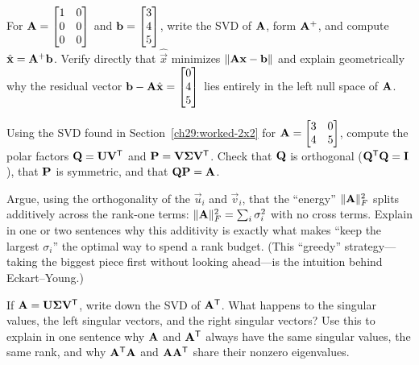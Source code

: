 \begin{exercise}
\label{ch29:ex-pinv}
For $\mathbf{A} = \begin{bmatrix} 1 & 0 \\ 0 & 0 \\ 0 & 0\end{bmatrix}$ and
$\mathbf{b} = \begin{bmatrix}3\\4\\5\end{bmatrix}$, write the SVD of $\mathbf{A}$, form $\mathbf{A}^+$, and
compute $\hat{\mathbf{x}} = \mathbf{A}^+\mathbf{b}$. Verify directly that
$\hat{\vec{x}}$ minimizes $\lVert\mathbf{A}\mathbf{x} - \mathbf{b}\rVert$ and explain
geometrically why the residual vector $\mathbf{b} - \mathbf{A}\hat{\mathbf{x}} = \begin{bmatrix}0\\4\\5\end{bmatrix}$
lies entirely in the left null space of $\mathbf{A}$.
\end{exercise}

\begin{exercise}
\label{ch29:ex-polar}
Using the SVD found in Section~\ref{ch29:worked-2x2} for
$\mathbf{A} = \begin{bmatrix} 3 & 0 \\ 4 & 5\end{bmatrix}$, compute the polar
factors $\mathbf{Q} = \mathbf{U}\mathbf{V}^{\mathsf{T}}$ and $\mathbf{P} = \mathbf{V}\mathbf{\Sigma}\mathbf{V}^{\mathsf{T}}$.
Check that $\mathbf{Q}$ is orthogonal ($\mathbf{Q}^{\mathsf{T}}\mathbf{Q} = \mathbf{I}$), that $\mathbf{P}$
is symmetric, and that $\mathbf{Q}\mathbf{P} = \mathbf{A}$.
\end{exercise}

\begin{exercise}
\label{ch29:ex-greedy}
Argue, using the orthogonality of the $\vec{u}_i$ and $\vec{v}_i$, that the
``energy'' $\lVert\mathbf{A}\rVert_F^2$ splits additively across the rank-one terms:
$\lVert\mathbf{A}\rVert_F^2 = \sum_i \sigma_i^2$ with no cross terms. Explain in one or
two sentences why this additivity is exactly what makes ``keep the largest
$\sigma_i$'' the optimal way to spend a rank budget. (This ``greedy'' strategy---taking
the biggest piece first without looking ahead---is the intuition behind
Eckart--Young.)
\end{exercise}

\begin{exercise}
\label{ch29:ex-transpose}
If $\mathbf{A} = \mathbf{U}\mathbf{\Sigma}\mathbf{V}^{\mathsf{T}}$, write down the SVD of $\mathbf{A}^{\mathsf{T}}$.
What happens to the singular values, the left singular vectors, and the right
singular vectors? Use this to explain in one sentence why $\mathbf{A}$ and
$\mathbf{A}^{\mathsf{T}}$ always have the same singular values, the same rank, and why
$\mathbf{A}^{\mathsf{T}}\mathbf{A}$ and $\mathbf{A}\mathbf{A}^{\mathsf{T}}$ share their nonzero eigenvalues.
\end{exercise}
